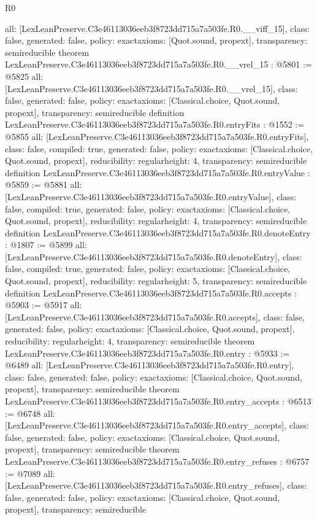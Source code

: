 \begin{lexlean}{R0}
\begin{coremodule}
{  all: [LexLeanPreserve.C3e46113036eeb3f8723dd715a7a503fe.R0.__viff_15],
  class: false,
  generated: false,
  policy: exact{axioms: [Quot.sound, propext]},
  transparency: semireducible
}
theorem LexLeanPreserve.C3e46113036eeb3f8723dd715a7a503fe.R0.__vrel_15 : @5801 := @5825 {
  all: [LexLeanPreserve.C3e46113036eeb3f8723dd715a7a503fe.R0.__vrel_15],
  class: false,
  generated: false,
  policy: exact{axioms: [Classical.choice, Quot.sound, propext]},
  transparency: semireducible
}
definition LexLeanPreserve.C3e46113036eeb3f8723dd715a7a503fe.R0.entryFits : @1552 := @5855 {
  all: [LexLeanPreserve.C3e46113036eeb3f8723dd715a7a503fe.R0.entryFits],
  class: false,
  compiled: true,
  generated: false,
  policy: exact{axioms: [Classical.choice, Quot.sound, propext]},
  reducibility: regular{height: 4},
  transparency: semireducible
}
definition LexLeanPreserve.C3e46113036eeb3f8723dd715a7a503fe.R0.entryValue : @5859 := @5881 {
  all: [LexLeanPreserve.C3e46113036eeb3f8723dd715a7a503fe.R0.entryValue],
  class: false,
  compiled: true,
  generated: false,
  policy: exact{axioms: [Classical.choice, Quot.sound, propext]},
  reducibility: regular{height: 4},
  transparency: semireducible
}
definition LexLeanPreserve.C3e46113036eeb3f8723dd715a7a503fe.R0.denoteEntry : @1807 := @5899 {
  all: [LexLeanPreserve.C3e46113036eeb3f8723dd715a7a503fe.R0.denoteEntry],
  class: false,
  compiled: true,
  generated: false,
  policy: exact{axioms: [Classical.choice, Quot.sound, propext]},
  reducibility: regular{height: 5},
  transparency: semireducible
}
definition LexLeanPreserve.C3e46113036eeb3f8723dd715a7a503fe.R0.accepts : @5903 := @5917 {
  all: [LexLeanPreserve.C3e46113036eeb3f8723dd715a7a503fe.R0.accepts],
  class: false,
  generated: false,
  policy: exact{axioms: [Classical.choice, Quot.sound, propext]},
  reducibility: regular{height: 4},
  transparency: semireducible
}
theorem LexLeanPreserve.C3e46113036eeb3f8723dd715a7a503fe.R0.entry : @5933 := @6489 {
  all: [LexLeanPreserve.C3e46113036eeb3f8723dd715a7a503fe.R0.entry],
  class: false,
  generated: false,
  policy: exact{axioms: [Classical.choice, Quot.sound, propext]},
  transparency: semireducible
}
theorem LexLeanPreserve.C3e46113036eeb3f8723dd715a7a503fe.R0.entry_accepts : @6513 := @6748 {
  all: [LexLeanPreserve.C3e46113036eeb3f8723dd715a7a503fe.R0.entry_accepts],
  class: false,
  generated: false,
  policy: exact{axioms: [Classical.choice, Quot.sound, propext]},
  transparency: semireducible
}
theorem LexLeanPreserve.C3e46113036eeb3f8723dd715a7a503fe.R0.entry_refuses : @6757 := @7089 {
  all: [LexLeanPreserve.C3e46113036eeb3f8723dd715a7a503fe.R0.entry_refuses],
  class: false,
  generated: false,
  policy: exact{axioms: [Classical.choice, Quot.sound, propext]},
  transparency: semireducible
}


\end{coremodule}
\end{lexlean}
